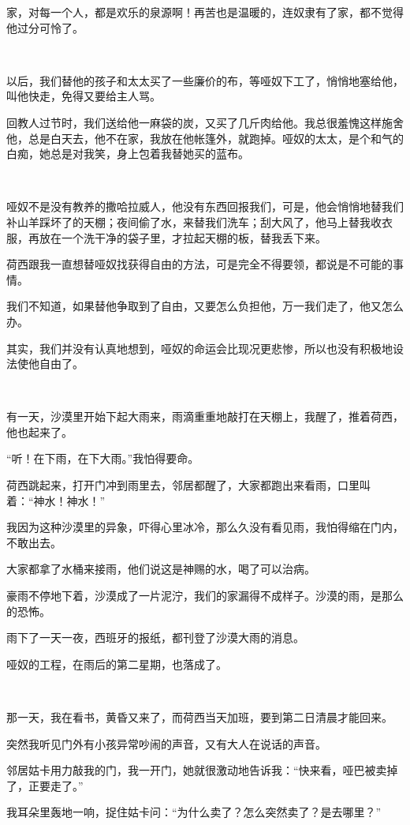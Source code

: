 \par 家，对每一个人，都是欢乐的泉源啊！再苦也是温暖的，连奴隶有了家，都不觉得他过分可怜了。
\par  
\par 以后，我们替他的孩子和太太买了一些廉价的布，等哑奴下工了，悄悄地塞给他，叫他快走，免得又要给主人骂。
\par 回教人过节时，我们送给他一麻袋的炭，又买了几斤肉给他。我总很羞愧这样施舍他，总是白天去，他不在家，我放在他帐篷外，就跑掉。哑奴的太太，是个和气的白痴，她总是对我笑，身上包着我替她买的蓝布。
\par  
\par 哑奴不是没有教养的撒哈拉威人，他没有东西回报我们，可是，他会悄悄地替我们补山羊踩坏了的天棚；夜间偷了水，来替我们洗车；刮大风了，他马上替我收衣服，再放在一个洗干净的袋子里，才拉起天棚的板，替我丢下来。
\par 荷西跟我一直想替哑奴找获得自由的方法，可是完全不得要领，都说是不可能的事情。
\par 我们不知道，如果替他争取到了自由，又要怎么负担他，万一我们走了，他又怎么办。
\par 其实，我们并没有认真地想到，哑奴的命运会比现况更悲惨，所以也没有积极地设法使他自由了。
\par  
\par 有一天，沙漠里开始下起大雨来，雨滴重重地敲打在天棚上，我醒了，推着荷西，他也起来了。
\par “听！在下雨，在下大雨。”我怕得要命。
\par 荷西跳起来，打开门冲到雨里去，邻居都醒了，大家都跑出来看雨，口里叫着：“神水！神水！”
\par 我因为这种沙漠里的异象，吓得心里冰冷，那么久没有看见雨，我怕得缩在门内，不敢出去。
\par 大家都拿了水桶来接雨，他们说这是神赐的水，喝了可以治病。
\par 豪雨不停地下着，沙漠成了一片泥泞，我们的家漏得不成样子。沙漠的雨，是那么的恐怖。
\par 雨下了一天一夜，西班牙的报纸，都刊登了沙漠大雨的消息。
\par 哑奴的工程，在雨后的第二星期，也落成了。
\par  
\par 那一天，我在看书，黄昏又来了，而荷西当天加班，要到第二日清晨才能回来。
\par 突然我听见门外有小孩异常吵闹的声音，又有大人在说话的声音。
\par 邻居姑卡用力敲我的门，我一开门，她就很激动地告诉我：“快来看，哑巴被卖掉了，正要走了。”
\par 我耳朵里轰地一响，捉住姑卡问：“为什么卖了？怎么突然卖了？是去哪里？”
